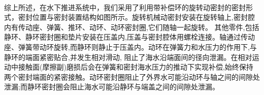 \documentclass{ctexart}
\begin{document}
\paragraph{}综上所述，在水下推进系统中，我们采用了利用带补偿环的旋转动密封的密封形式，密封位置与密封装置结构如图所示。旋转机械动密封安装在旋转轴上,密封腔内有传动座、弹簧、推环、动环、动环密封圈,它们随轴一起旋转。
            其他零件,包括静环、静环密封圈和垫片安装在压盖内,压盖与密封腔体用螺栓连接。轴通过传动座、弹簧带动环旋转,而静环则静止于压盖内。动环在弹簧力和水压力的作用下,与静环的端面紧密贴合,并发生相对滑动,
            阻止了海水沿端面间的径向泄漏。在相对运动中接触面(摩擦副)磨损后会在弹簧和密封海水压力的推动下实现补偿,始终保持两个密封端面的紧密接触。动环密封圈阻止了外界水可能沿动环与轴之间的间隙处泄漏;而静环密封圈会阻止海水可能沿静环与端盖之间的间隙处泄漏。


\paragraph{}
\end{document}
